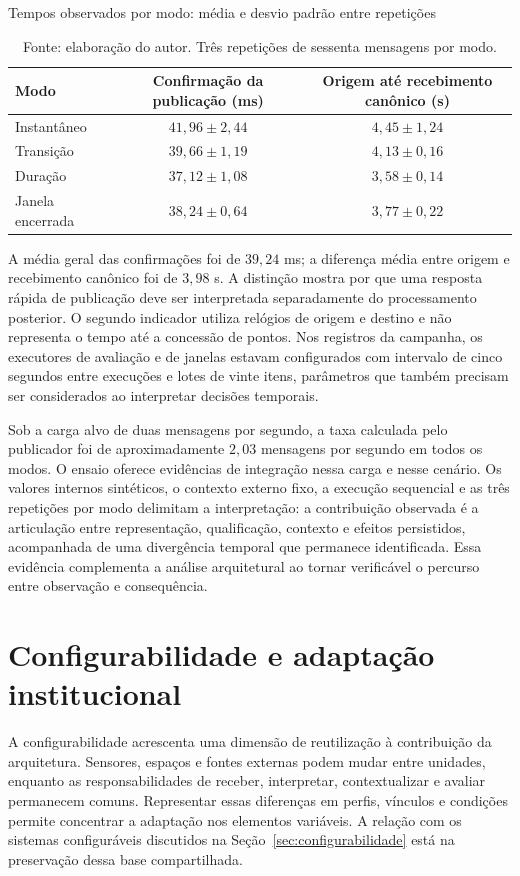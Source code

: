\documentclass[tcc,capa]{texufpel}
\begin{document}
\begin{table}[htbp]\centering\small
\caption{Tempos observados por modo: média e desvio padrão entre repetições}\label{tab:tempos-integrados}
\begin{tabularx}{\textwidth}{Ycc}\toprule
Modo & Confirmação da publicação (ms) & Origem até recebimento canônico (s) \\\midrule
Instantâneo & $41{,}96 \pm 2{,}44$ & $4{,}45 \pm 1{,}24$ \\
Transição & $39{,}66 \pm 1{,}19$ & $4{,}13 \pm 0{,}16$ \\
Duração & $37{,}12 \pm 1{,}08$ & $3{,}58 \pm 0{,}14$ \\
Janela encerrada & $38{,}24 \pm 0{,}64$ & $3{,}77 \pm 0{,}22$ \\\bottomrule
\end{tabularx}
\caption*{Fonte: elaboração do autor. Três repetições de sessenta mensagens por modo.}
\end{table}

A média geral das confirmações foi de $39{,}24$ ms; a diferença média entre origem e recebimento canônico foi de $3{,}98$ s. A distinção mostra por que uma resposta rápida de publicação deve ser interpretada separadamente do processamento posterior. O segundo indicador utiliza relógios de origem e destino e não representa o tempo até a concessão de pontos. Nos registros da campanha, os executores de avaliação e de janelas estavam configurados com intervalo de cinco segundos entre execuções e lotes de vinte itens, parâmetros que também precisam ser considerados ao interpretar decisões temporais.

Sob a carga alvo de duas mensagens por segundo, a taxa calculada pelo publicador foi de aproximadamente $2{,}03$ mensagens por segundo em todos os modos. O ensaio oferece evidências de integração nessa carga e nesse cenário. Os valores internos sintéticos, o contexto externo fixo, a execução sequencial e as três repetições por modo delimitam a interpretação: a contribuição observada é a articulação entre representação, qualificação, contexto e efeitos persistidos, acompanhada de uma divergência temporal que permanece identificada. Essa evidência complementa a análise arquitetural ao tornar verificável o percurso entre observação e consequência.

\section{Configurabilidade e adaptação institucional}
A configurabilidade acrescenta uma dimensão de reutilização à contribuição da arquitetura. Sensores, espaços e fontes externas podem mudar entre unidades, enquanto as responsabilidades de receber, interpretar, contextualizar e avaliar permanecem comuns. Representar essas diferenças em perfis, vínculos e condições permite concentrar a adaptação nos elementos variáveis. A relação com os sistemas configuráveis discutidos na Seção~\ref{sec:configurabilidade} está na preservação dessa base compartilhada.
\end{document}
